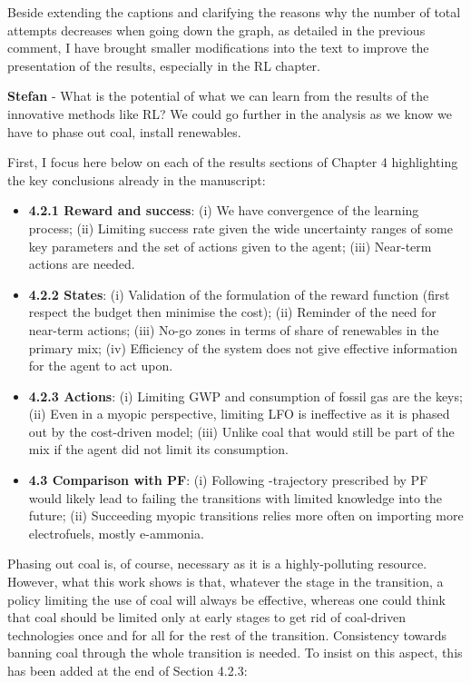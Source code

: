 \documentclass[12pt,a4paper]{article}
\begin{document}
\noindent Beside extending the captions and clarifying the reasons why the number of total attempts decreases when going down the graph, as detailed in the previous comment, I have brought smaller modifications into the text to improve the presentation of the results, especially in the RL chapter.

\begin{mdframed}[style=comment] %
{\color{teal} \textbf{Stefan}} - What is the potential of what we can learn from the results of the innovative methods like RL? We could go further in the analysis as we know we have to phase out coal, install renewables.
\end{mdframed}

\noindent First, I focus here below on each of the results sections of Chapter 4 highlighting the key conclusions already in the manuscript:

\begin{itemize}
\item \textbf{4.2.1 Reward and success}: (i) We have convergence of the learning process; (ii) Limiting success rate given the wide uncertainty ranges of some key parameters and the set of actions given to the agent; (iii) Near-term actions are needed.
\item \textbf{4.2.2 States}: (i) Validation of the formulation of the reward function (first respect the  budget then minimise the cost); (ii) Reminder of the need for near-term actions; (iii) No-go zones in terms of share of renewables in the primary mix; (iv) Efficiency of the system does not give effective information for the agent to act upon.
\item \textbf{4.2.3 Actions}: (i) Limiting GWP and consumption of fossil gas are the keys; (ii) Even in a myopic perspective, limiting LFO is ineffective as it is phased out by the cost-driven model; (iii) Unlike coal that would still be part of the mix if the agent did not limit its consumption.
\item \textbf{4.3 Comparison with PF}: (i) Following -trajectory prescribed by PF would likely lead to failing the transitions with limited knowledge into the future; (ii) Succeeding myopic transitions relies more often on importing more electrofuels, mostly e-ammonia. 
\end{itemize}

Phasing out coal is, of course, necessary as it is a highly-polluting resource. However, what this work shows is that, whatever the stage in the transition, a policy limiting the use of coal will always be effective, whereas one could think that coal should be limited only at early stages to get rid of coal-driven technologies once and for all for the rest of the transition. Consistency towards banning coal through the whole transition is needed. To insist on this aspect, this has been added {\color{blue}at the end of Section 4.2.3}:
\end{document}
